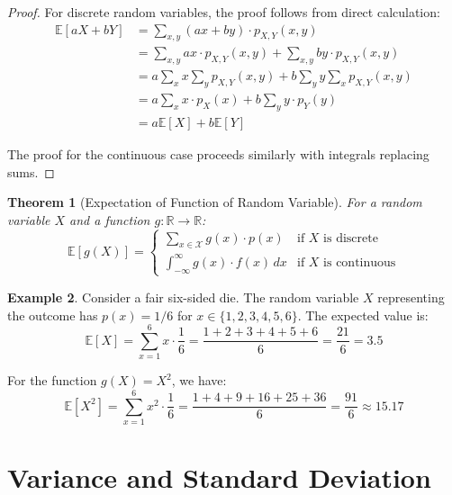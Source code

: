 \documentclass[12pt,a4paper]{article}
\theoremstyle{plain}
\newtheorem{theorem}{Theorem}[section]
\theoremstyle{definition}
\newtheorem{example}[theorem]{Example}
\begin{document}
\begin{proof}
For discrete random variables, the proof follows from direct calculation:
\begin{align*}
\mathbb{E}[aX + bY] &= \sum_{x,y} (ax + by) \cdot p_{X,Y}(x,y)\\
&= \sum_{x,y} ax \cdot p_{X,Y}(x,y) + \sum_{x,y} by \cdot p_{X,Y}(x,y)\\
&= a\sum_{x} x \sum_{y} p_{X,Y}(x,y) + b\sum_{y} y \sum_{x} p_{X,Y}(x,y)\\
&= a\sum_{x} x \cdot p_X(x) + b\sum_{y} y \cdot p_Y(y)\\
&= a\mathbb{E}[X] + b\mathbb{E}[Y]
\end{align*}

The proof for the continuous case proceeds similarly with integrals replacing sums.
\end{proof}

\begin{theorem}[Expectation of Function of Random Variable]
For a random variable $X$ and a function $g:\mathbb{R} \to \mathbb{R}$:
\begin{equation}
\mathbb{E}[g(X)] = 
\begin{cases}
\sum_{x \in \mathcal{X}} g(x) \cdot p(x) & \text{if $X$ is discrete}\\
\int_{-\infty}^{\infty} g(x) \cdot f(x) \, dx & \text{if $X$ is continuous}
\end{cases}
\end{equation}
\end{theorem}

\begin{example}
Consider a fair six-sided die. The random variable $X$ representing the outcome has $p(x) = 1/6$ for $x \in \{1,2,3,4,5,6\}$. The expected value is:
\begin{equation*}
\mathbb{E}[X] = \sum_{x=1}^{6} x \cdot \frac{1}{6} = \frac{1+2+3+4+5+6}{6} = \frac{21}{6} = 3.5
\end{equation*}

For the function $g(X) = X^2$, we have:
\begin{equation*}
\mathbb{E}[X^2] = \sum_{x=1}^{6} x^2 \cdot \frac{1}{6} = \frac{1+4+9+16+25+36}{6} = \frac{91}{6} \approx 15.17
\end{equation*}
\end{example}

\section{Variance and Standard Deviation}
\end{document}
